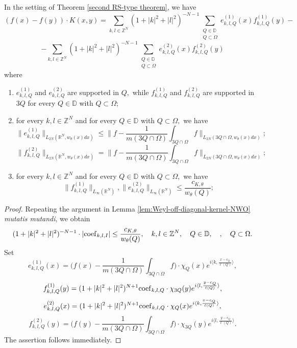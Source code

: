 \documentclass{amsart}
\begin{document}
\begin{lemma}\label{lem:Weyl-diagonal-kernel-NWO} In the setting of Theorem \ref{second RS-type theorem}, we have
$$(f(x)-f(y))\cdot K(x,y)=\sum_{k,l\in\mathbb{Z}^N}(1+|k|^2+|l|^2)^{-N-1}\sum_{\substack{Q\in\mathbb{D}\\ Q\subset\Omega}}e_{k,l,Q}^{(1)}(x)f_{k,l,Q}^{(1)}(y)-$$
$$-\sum_{k,l\in\mathbb{Z}^N}(1+|k|^2+|l|^2)^{-N-1}\sum_{\substack{Q\in\mathbb{D}\\ Q\subset\Omega}}e_{k,l,Q}^{(2)}(x)f_{k,l,Q}^{(2)}(y)$$
where
\begin{enumerate}[{\rm (i)}]
\item $e_{k,l,Q}^{(1)}$ and $e_{k,l,Q}^{(2)}$ are supported in $Q,$ while $f_{k,l,Q}^{(1)}$ and $f_{k,l,Q}^{(2)}$ are supported in $3Q$ for every $Q\in\mathbb{D}$ with $Q\subset\Omega;$
\item for every $k,l\in\mathbb{Z}^N$ and for every $Q\in\mathbb{D}$ with $Q\subset\Omega,$ we have
$$\|e_{k,l,Q}^{(1)}\|_{L_{2N}(\mathbb{R}^N,w_{\theta}(x)dx)}\leq\Big\|f-\frac1{m(3Q\cap\Omega)}\int_{3Q\cap\Omega}f\Big\|_{L_{2N}(3Q\cap\Omega,w_{\theta}(x)dx)};$$
$$\|f_{k,l,Q}^{(2)}\|_{L_{2N}(\mathbb{R}^N,w_{\theta}(x)dx)}=\Big\|f-\frac1{m(3Q\cap\Omega)}\int_{3Q\cap\Omega}f\Big\|_{L_{2N}(3Q\cap\Omega,w_{\theta}(x)dx)};$$
\item for every $k,l\in\mathbb{Z}^N$ and for every $Q\in\mathbb{D}$ with $Q\subset\Omega,$ we have
$$\|f_{k,l,Q}^{(1)}\|_{L_{\infty}(\mathbb{R}^N)},\|e_{k,l,Q}^{(2)}\|_{L_{\infty}(\mathbb{R}^N)}\leq \frac{c_{K,\theta}}{w_{\theta}(Q)};$$
\end{enumerate}
\end{lemma}
\begin{proof} Repeating the argument in Lemma \ref{lem:Weyl-off-diagonal-kernel-NWO} {\it mutatis mutandi}, we obtain
$$(1+|k|^2+|l|^2)^{-N-1}\cdot|{\rm coef}_{k,l,I}|\leq \frac{c_{K,\theta}}{w_{\theta}(Q)},\quad k,l\in\mathbb{Z}^N,\quad Q\in\mathbb{D},\quad ,\quad Q\subset\Omega.$$
Set
$$e_{k,l,Q}^{(1)}(x)=\Big(f(x)-\frac1{m(3Q\cap\Omega)}\int_{3Q\cap\Omega}f\Big)\cdot\chi_Q(x)e^{i\langle k,\frac{x-c_Q}{\ell(Q)}\rangle},$$
$$f_{k,l,Q}^{(1)}(y)=(1+|k|^2+|l|^2)^{N+1}{\rm coef}_{k,l,Q}\cdot \chi_{3Q}(y)e^{i\langle l,\frac{y-c_Q}{\ell(Q)}\rangle},$$
$$e_{k,l,Q}^{(2)}(x)=(1+|k|^2+|l|^2)^{N+1}{\rm coef}_{k,l,Q}\cdot\chi_Q(x)e^{i\langle k,\frac{x-c_Q}{\ell(Q)}\rangle},$$
$$f_{k,l,Q}^{(2)}(y)=\Big(f(y)-\frac1{m(3Q\cap\Omega)}\int_{3Q\cap\Omega}f\Big)\cdot \chi_{3Q}(y)e^{i\langle l,\frac{y-c_Q}{\ell(Q)}\rangle}.$$
The assertion follows immediately.
\end{proof}
\end{document}
